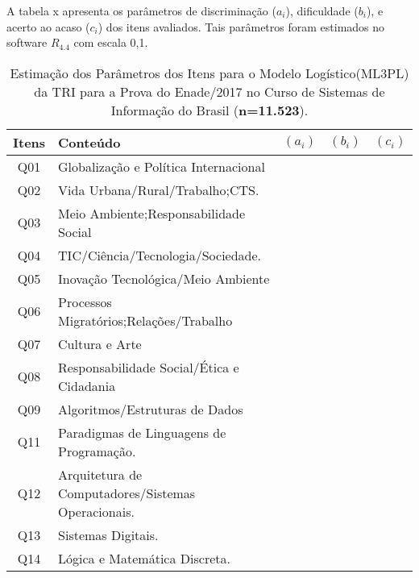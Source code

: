 \documentclass[12pt]{article}
\begin{document}
A tabela x apresenta os parâmetros de discriminação ($a_{i}$), dificuldade ($b_{i}$), e acerto ao acaso ($c_{i}$) dos itens avaliados. Tais parâmetros foram estimados no software $R_{4.4}$ com escala 0,1.


\begin{table}[]
	\centering
	\caption{Estimação dos Parâmetros dos Itens para o Modelo Logístico(ML3PL) da TRI para a Prova do Enade/2017 no Curso de Sistemas de Informação do Brasil (\textbf{n=11.523}).}
\begin{tabular}{c|l|c|c|c}
\hline\hline 
  Itens     &  Conteúdo                                            &  $(a_{i})$  & $(b_{i})$ & $(c_{i})$ \\
\hline\hline
  Q01       &  Globalização e Política Internacional               &             &           &     \\
  Q02       &  Vida Urbana/Rural/Trabalho;CTS.                     &             &           &       \\
  Q03       &  Meio Ambiente;Responsabilidade Social               &             &           &       \\
  Q04       &  TIC/Ciência/Tecnologia/Sociedade.                   &             &           &     \\
  Q05       & Inovação Tecnológica/Meio Ambiente                   &             &           &       \\
  Q06       & Processos Migratórios;Relações/Trabalho              &             &           &       \\
  Q07       & Cultura e Arte                                       &             &           &      \\
  Q08       & Responsabilidade Social/Ética e Cidadania            &             &           &       \\
  Q09       & Algoritmos/Estruturas de Dados                       &             &           &    \\
  Q11       & Paradigmas de Linguagens de Programação.             &             &           &       \\
  Q12       & Arquitetura de Computadores/Sistemas Operacionais.   &             &           &       \\
  Q13       & Sistemas Digitais.                                   &             &           &       \\
  Q14       & Lógica e Matemática Discreta.                        &             &           &       \\

\end{tabular}
\end{table}
\end{document}
